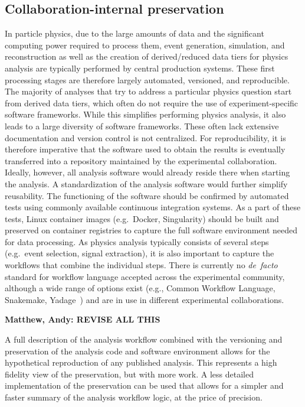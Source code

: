 \documentclass[11pt]{article}
\begin{document}
\subsection{Collaboration-internal preservation}

In particle physics, due to the large amounts of data and the significant computing power required to process them, event generation, simulation, and reconstruction as well as the creation of derived/reduced data tiers for physics analysis are typically performed by central production systems. These first processing stages are therefore largely automated, versioned, and reproducible. The majority of analyses that try to address a particular physics question start from derived data tiers, which often do not require the use of experiment-specific software frameworks. While this simplifies performing physics analysis, it also leads to a large diversity of software frameworks. These often lack extensive documentation and version control is not centralized. For reproducibility, it is therefore imperative that the software used to obtain the results is eventually transferred into a repository maintained by the experimental collaboration. Ideally, however, all analysis software would already reside there when starting the analysis. A standardization of the analysis software would further simplify reusability. The functioning of the software should be confirmed by automated tests using commonly available continuous integration systems. As a part of these tests, Linux container images (e.g.~Docker, Singularity) should be built and preserved on container registries to capture the full software environment needed for data processing. As physics analysis typically consists of several steps (e.g.~event selection, signal extraction), it is also important to capture the workflows that combine the individual steps.
There is currently no \emph{de~facto} standard for workflow language accepted across the experimental community, although a wide range of options exist (e.g., Common Workflow Language, Snakemake, Yadage~\cite{Cranmer:2017frf,yadage_code}) and are in use in different experimental collaborations.


\textbf{Matthew, Andy: REVISE ALL THIS}

A full description of the analysis workflow combined with the versioning and preservation of the analysis code and software environment allows for the hypothetical reproduction of any published analysis.
This represents a high fidelity view of the preservation, but with more work.
A less detailed implementation of the preservation can be used that allows for a simpler and faster summary of the analysis workflow logic, at the price of precision.
\end{document}
